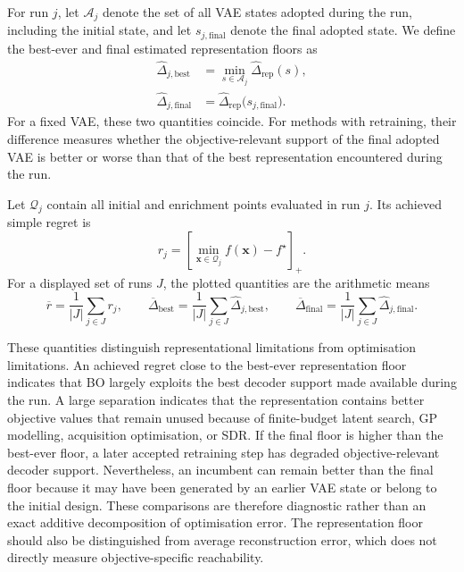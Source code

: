 \documentclass[pdflatex,sn-mathphys-num]{sn-jnl}%
\theoremstyle{thmstyleone}%
\theoremstyle{thmstyletwo}%
\theoremstyle{thmstylethree}%
\begin{document}
For run $j$, let $\mathcal A_j$ denote the set of all VAE states adopted during the run, including the initial state, and let $s_{j,\mathrm{final}}$ denote the final adopted state. We define the best-ever and final estimated representation floors as
\begin{align}
  \widehat{\Delta}_{j,\mathrm{best}}
  &=
  \min_{s\in\mathcal A_j}
  \widehat{\Delta}_{\mathrm{rep}}(s),\\
  \widehat{\Delta}_{j,\mathrm{final}}
  &=
  \widehat{\Delta}_{\mathrm{rep}}
  \bigl(s_{j,\mathrm{final}}\bigr).
\end{align}
For a fixed VAE, these two quantities coincide. For methods with retraining, their difference measures whether the objective-relevant support of the final adopted VAE is better or worse than that of the best representation encountered during the run.

Let $\mathcal Q_j$ contain all initial and enrichment points evaluated in run $j$. Its achieved simple regret is
\begin{equation}
  r_j
  =
  \left[
    \min_{\mathbf{x}\in\mathcal Q_j} f(\mathbf{x})-f^\star
  \right]_+.
\end{equation}
For a displayed set of runs $J$, the plotted quantities are the arithmetic
means
\begin{equation}
  \overline r
  =
  \frac{1}{|J|}\sum_{j\in J}r_j,
  \qquad
  \overline{\Delta}_{\mathrm{best}}
  =
  \frac{1}{|J|}
  \sum_{j\in J}\widehat{\Delta}_{j,\mathrm{best}},
  \qquad
  \overline{\Delta}_{\mathrm{final}}
  =
  \frac{1}{|J|}
  \sum_{j\in J}\widehat{\Delta}_{j,\mathrm{final}}.
  \label{eq:mean-representation-floors}
\end{equation}

These quantities distinguish representational limitations from optimisation limitations. An achieved regret close to the best-ever representation floor indicates that BO largely exploits the best decoder support made available during the run. A large separation indicates that the representation contains better objective values that remain unused because of finite-budget latent search, GP modelling, acquisition optimisation, or SDR. If the final floor is higher than the best-ever floor, a later accepted retraining step has degraded objective-relevant decoder support. Nevertheless, an incumbent can remain better than the final floor because it may have been generated by an earlier VAE state or belong to the initial design. These comparisons are therefore diagnostic rather than an exact additive decomposition of optimisation error. The representation floor should also be distinguished from average reconstruction error, which does not directly measure objective-specific reachability.
\end{document}
